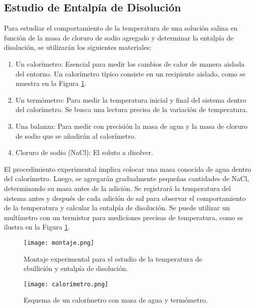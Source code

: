 \documentclass{article}
\begin{document}
\subsection{Estudio de Entalpía de Disolución}
Para estudiar el comportamiento de la temperatura de una solución salina en función de la masa de cloruro de sodio agregado y determinar la entalpía de disolución, se utilizarán los siguientes materiales:
\begin{enumerate}
    \item Un calorímetro: Esencial para medir los cambios de calor de manera aislada del entorno. Un calorímetro típico consiste en un recipiente aislado, como se muestra en la Figura \ref{fig:calorimeter}.
    \item Un termómetro: Para medir la temperatura inicial y final del sistema dentro del calorímetro. Se busca una lectura precisa de la variación de temperatura.
    \item Una balanza: Para medir con precisión la masa de agua y la masa de cloruro de sodio que se añadirán al calorímetro.
    \item Cloruro de sodio (NaCl): El soluto a disolver.
\end{enumerate}
El procedimiento experimental implica colocar una masa conocida de agua dentro del calorímetro. Luego, se agregarán gradualmente pequeñas cantidades de NaCl, determinando su masa antes de la adición. Se registrará la temperatura del sistema antes y después de cada adición de sal para observar el comportamiento de la temperatura y calcular la entalpía de disolución. Se puede utilizar un multímetro con un termistor para mediciones precisas de temperatura, como se ilustra en la Figura \ref{fig:calorimeter}.

\begin{figure}[H]
    \centering
    \begin{minipage}{0.45\textwidth}
        \centering
        \texttt{[image: montaje.png]}
        \caption{Montaje experimental para el estudio de la temperatura de ebullición y entalpía de disolución.}
        \label{fig:setup}
    \end{minipage}
    \hfill
    \begin{minipage}{0.45\textwidth}
        \centering
        \texttt{[image: calorímetro.png]}
        \caption{Esquema de un calorímetro con masa de agua y termómetro.}
        \label{fig:calorimeter}
    \end{minipage}
\end{figure}
\end{document}
